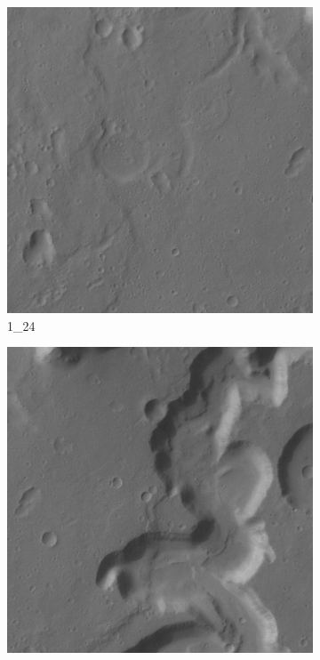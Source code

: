 \begin{figure}[H]
	\centering
	\begin{subfigure}{0.3\textwidth}
		\centering
		\includegraphics[width=\textwidth,keepaspectratio]{images/h0905_0000/1_24.jpg}
		\caption{1\_24}
	\end{subfigure}
	\begin{subfigure}{0.3\textwidth}
		\centering
		\includegraphics[width=\textwidth,keepaspectratio]{images/h0905_0000/2_24.jpg}

\end{subfigure}
\end{figure}
